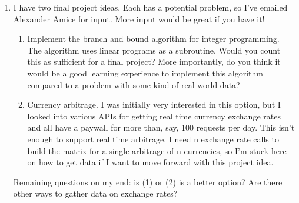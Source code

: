 \documentclass{article}
\begin{document}
\begin{enumerate}
    \item I have two final project ideas. Each has a potential problem, so I've emailed Alexander Amice for input. More input would be great if you have it! \begin{enumerate}
        \item Implement the branch and bound algorithm for integer programming. The algorithm uses linear programs as a subroutine. Would you count this as sufficient for a final project? More importantly, do you think it would be a good learning experience to implement this algorithm compared to a problem with some kind of real world data?
        \item Currency arbitrage. I was initially very interested in this option, but I looked into various APIs for getting real time currency exchange rates and all have a paywall for more than, say, 100 requests per day. This isn't enough to support real time arbitrage. I need n exchange rate calls to build the matrix for a single arbitrage of n currencies, so I'm stuck here on how to get data if I want to move forward with this project idea.
    \end{enumerate} Remaining questions on my end: is (1) or (2) is a better option? Are there other ways to gather data on exchange rates?
\end{enumerate}
\end{document}
